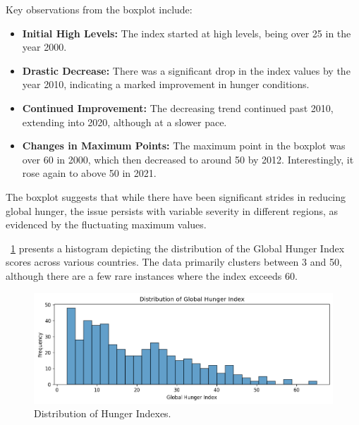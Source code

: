                 Key observations from the boxplot include:

                \begin{itemize}
                        \item \textbf{Initial High Levels:} The index started at high levels, being over 25 in the year 2000.

                        \item \textbf{Drastic Decrease:} There was a significant drop in the index values by the year 2010, indicating a marked improvement in hunger conditions.

                        \item \textbf{Continued Improvement:} The decreasing trend continued past 2010, extending into 2020, although at a slower pace.

                        \item \textbf{Changes in Maximum Points:} The maximum point in the boxplot was over 60 in 2000, which then decreased to around 50 by 2012. Interestingly, it rose again to above 50 in 2021.
                \end{itemize}

                The boxplot suggests that while there have been significant strides in reducing global hunger, the issue persists with variable severity in different regions, as evidenced by the fluctuating maximum values.


                \figurename~\ref{fig:du-hunger-distribution} presents a histogram depicting the distribution of the Global Hunger Index scores across various countries. The data primarily clusters between 3 and 50, although there are a few rare instances where the index exceeds 60.

                \begin{figure}[H]
                        \centering
                        \includegraphics[scale=0.8]{images/du_hunger_hu_in_freq}
                        \caption{Distribution of Hunger Indexes.}
                        \label{fig:du-hunger-distribution}
                \end{figure}


